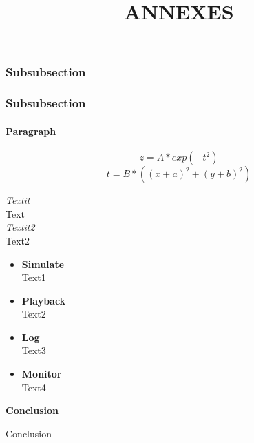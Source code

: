 \documentclass[a4paper]{report}
\begin{document}
\subsubsection{Subsubsection}
\subsubsection{Subsubsection}

\paragraph{Paragraph}

	\begin{equation}
		z = A*exp(-t^2)
	\end{equation}
	\begin{equation}
		t = B*((x+a)^2 + (y+b)^2)
	\end{equation}


	\textit{Textit}\\
	Text \\

	\textit{Textit2}\\
	Text2 \\

\vspace{2cm}

	\begin{itemize}
		\item \textbf{Simulate}\\
			Text1
		\item \textbf{Playback}\\
			Text2
		\item \textbf{Log}\\
			Text3
		\item \textbf{Monitor}\\
			Text4
	\end{itemize}

\newpage

	\begin{center}
		\textbf{\LARGE{Conclusion}}
	\end{center}

\vspace{5cm}

Conclusion

\newpage
\nocite{*}






\newpage

	\begin{center}
		\title{ \HRule{} \\ [12cm]
				\LARGE \textbf{\uppercase{Annexes}}\\ [12cm]
				\HRule{}}
		\maketitle
	\end{center}
\end{document}
